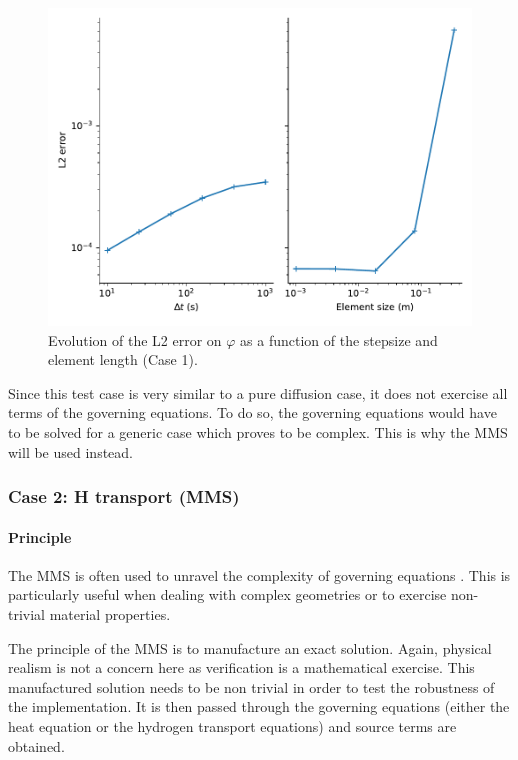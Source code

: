 \begin{figure}
    \centering
    \includegraphics[width=\linewidth]{Figures/Chapter2/error_vs_element_size_and_dt.pdf}
    \caption{Evolution of the L2 error on $\varphi$ as a function of the stepsize and element length (Case 1).}
\end{figure}


Since this test case is very similar to a pure diffusion case, it does not exercise all terms of the governing equations.
To do so, the governing equations would have to be solved for a generic case which proves to be complex.
This is why the MMS will be used instead.

\subsubsection{Case 2: H transport (MMS)} \label{mms}

\paragraph{Principle}
The MMS is often used to unravel the complexity of governing equations .
This is particularly useful when dealing with complex geometries or to exercise non-trivial material properties.

The principle of the MMS is to manufacture an exact solution.
Again, physical realism is not a concern here as verification is a mathematical exercise.
This manufactured solution needs to be non trivial in order to test the robustness of the implementation.
It is then passed through the governing equations (either the heat equation or the hydrogen transport equations) and source terms are obtained.

